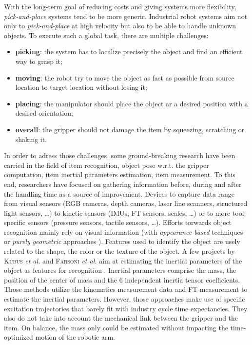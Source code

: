 \documentclass[/home/francois/latex/report/main.tex]{subfiles}
\begin{document}
With the long-term goal of reducing costs and giving systems more flexibility, \textit{pick-and-place} systems tend to be more generic. Industrial robot systems aim not only to \textit{pick-and-place} at high velocity but also to be able to handle unknown objects. To execute such a global task, there are multiple challenges:
\begin{itemize}
	\item \textbf{picking}: the system has to localize precisely the object and find an efficient way to grasp it;
	\item \textbf{moving}: the robot try to move the object as fast as possible from source location to target location without losing it;
	\item \textbf{placing}: the manipulator should place the object ar a desired position with a desired orientation;
	\item \textbf{overall}: the gripper should not damage the item by squeezing, scratching or shaking it.
\end{itemize}

In order to adress those challenges, some ground-breaking research have been carried in the field of item recognition, object pose w.r.t. the gripper computation, item inertial parameters estimation, item measurement. To this end, researchers have focused on gathering information before, during and after the handling time as a source of improvement. Devices to capture data range from visual sensors (RGB cameras, depth cameras, laser line scanners, structured light sensors, \ldots) to kinetic sensors (\ac{IMUs}, \ac{FT} sensors, scales, \ldots) or to more tool-specific sensors (pressure sensors, tactile sensors, \ldots). Efforts torwards object recognition mainly rely on visual information (with \textit{appearance-based} techniques \cite{Carmichael2002, Schmid1997, Viola2001, Murase1993} or \textit{purely geometric} approaches \cite{Hut1987, Sethi2001}). Features used to identify the object are usely related to the shape, the color or the texture of the object. A few projects by \textsc{Kubus} \textit{et al.} and \textsc{Farsoni} \textit{et al.} aim at estimating the inertial parameters of the object as features for recognition \cite{Kubus2008, Kubus2007, Kubus2014, Farsoni2018}. Inertial parameters comprise the mass, the position of the center of mass and the 6 independent inertia tensor coefficients. Those methods utilize the kinematics measurement data and \ac{FT} measurement to estimate the inertial parameters. However, those approaches make use of specific excitation trajectories that barely fit with industry cycle time expectancies. They also do not take into account the mechanical link between the gripper and the item. On balance, the mass only could be estimated without impacting the time-optimized motion of the robotic arm.
\end{document}
